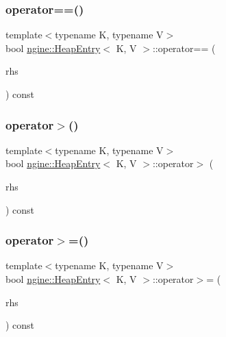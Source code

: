 \subsubsection{\texorpdfstring{operator==()}{operator==()}}
{\footnotesize\ttfamily template$<$typename K, typename V$>$ \\
bool \hyperlink{structngine_1_1HeapEntry}{ngine\+::\+Heap\+Entry}$<$ K, V $>$\+::operator== (\begin{DoxyParamCaption}\item[{const \hyperlink{structngine_1_1HeapEntry}{Heap\+Entry}$<$ K, V $>$ \&}]{rhs }\end{DoxyParamCaption}) const\hspace{0.3cm}{\ttfamily [inline]}}

\mbox{\label{structngine_1_1HeapEntry_ae8297988ca0d41e75e890e738b691783}} 
\subsubsection{\texorpdfstring{operator$>$()}{operator>()}}
{\footnotesize\ttfamily template$<$typename K, typename V$>$ \\
bool \hyperlink{structngine_1_1HeapEntry}{ngine\+::\+Heap\+Entry}$<$ K, V $>$\+::operator$>$ (\begin{DoxyParamCaption}\item[{const \hyperlink{structngine_1_1HeapEntry}{Heap\+Entry}$<$ K, V $>$ \&}]{rhs }\end{DoxyParamCaption}) const\hspace{0.3cm}{\ttfamily [inline]}}

\mbox{\label{structngine_1_1HeapEntry_a31f6b917e1537f997cb4976110af2d2a}} 
\subsubsection{\texorpdfstring{operator$>$=()}{operator>=()}}
{\footnotesize\ttfamily template$<$typename K, typename V$>$ \\
bool \hyperlink{structngine_1_1HeapEntry}{ngine\+::\+Heap\+Entry}$<$ K, V $>$\+::operator$>$= (\begin{DoxyParamCaption}\item[{const \hyperlink{structngine_1_1HeapEntry}{Heap\+Entry}$<$ K, V $>$ \&}]{rhs }\end{DoxyParamCaption}) const\hspace{0.3cm}{\ttfamily [inline]}}



